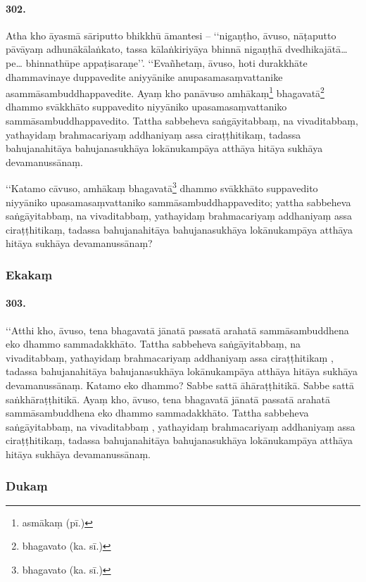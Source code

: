 \paragraph{302.} Atha kho āyasmā sāriputto bhikkhū āmantesi – ‘‘nigaṇṭho, āvuso, nāṭaputto pāvāyaṃ adhunākālaṅkato, tassa kālaṅkiriyāya bhinnā nigaṇṭhā dvedhikajātā…pe… bhinnathūpe appaṭisaraṇe’’. ‘‘Evañhetaṃ, āvuso, hoti durakkhāte dhammavinaye duppavedite aniyyānike anupasamasaṃvattanike asammāsambuddhappavedite. Ayaṃ kho panāvuso amhākaṃ\footnote{asmākaṃ (pī.)} bhagavatā\footnote{bhagavato (ka. sī.)} dhammo svākkhāto suppavedito niyyāniko upasamasaṃvattaniko sammāsambuddhappavedito. Tattha sabbeheva saṅgāyitabbaṃ, na vivaditabbaṃ, yathayidaṃ brahmacariyaṃ addhaniyaṃ assa ciraṭṭhitikaṃ, tadassa bahujanahitāya bahujanasukhāya lokānukampāya atthāya hitāya sukhāya devamanussānaṃ.

‘‘Katamo cāvuso, amhākaṃ bhagavatā\footnote{bhagavato (ka. sī.)} dhammo svākkhāto suppavedito niyyāniko upasamasaṃvattaniko sammāsambuddhappavedito; yattha sabbeheva saṅgāyitabbaṃ, na vivaditabbaṃ, yathayidaṃ brahmacariyaṃ addhaniyaṃ assa ciraṭṭhitikaṃ, tadassa bahujanahitāya bahujanasukhāya lokānukampāya atthāya hitāya sukhāya devamanussānaṃ?

\subsubsection{Ekakaṃ}

\paragraph{303.} ‘‘Atthi kho, āvuso, tena bhagavatā jānatā passatā arahatā sammāsambuddhena eko dhammo sammadakkhāto. Tattha sabbeheva saṅgāyitabbaṃ, na vivaditabbaṃ, yathayidaṃ brahmacariyaṃ addhaniyaṃ assa ciraṭṭhitikaṃ , tadassa bahujanahitāya bahujanasukhāya lokānukampāya atthāya hitāya sukhāya devamanussānaṃ. Katamo eko dhammo? Sabbe sattā āhāraṭṭhitikā. Sabbe sattā saṅkhāraṭṭhitikā. Ayaṃ kho, āvuso, tena bhagavatā jānatā passatā arahatā sammāsambuddhena eko dhammo sammadakkhāto. Tattha sabbeheva saṅgāyitabbaṃ, na vivaditabbaṃ , yathayidaṃ brahmacariyaṃ addhaniyaṃ assa ciraṭṭhitikaṃ, tadassa bahujanahitāya bahujanasukhāya lokānukampāya atthāya hitāya sukhāya devamanussānaṃ.

\subsubsection{Dukaṃ}


